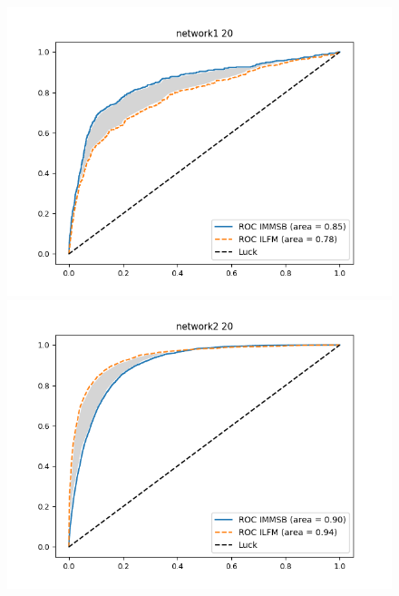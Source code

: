 \begin{figure}[h]
\centering
    \begin{minipage}{0.24\textwidth}
        \includegraphics[width=\textwidth]{img/corpus/roc_network1_20_f}
    \end{minipage}
    \begin{minipage}{0.24\textwidth}
        \includegraphics[width=\textwidth]{img/corpus/roc_network2_20_f}
    \end{minipage}
    \begin{minipage}{0.4\textwidth}

\end{minipage}
\end{figure}
